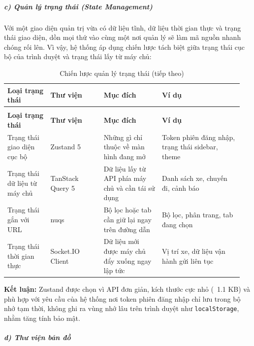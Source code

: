 \documentclass[a4paper]{extarticle}
\newcommand{\thesissettableid}[2]{%
  \renewcommand{\thetable}{#1}%
  \renewcommand{\theHtable}{#2}%
}
\begin{document}
\subparagraph{c) Quản lý trạng thái (State
Management)}\label{c-quux1ea3n-luxfd-trux1ea1ng-thuxe1i-state-management}

Với một giao diện quản trị vừa có dữ liệu tĩnh, dữ liệu thời gian thực và trạng
thái giao diện, dồn mọi thứ vào cùng một nơi quản lý sẽ làm mã nguồn
nhanh chóng rối lên. Vì vậy, hệ thống áp dụng chiến lược tách biệt giữa
trạng thái cục bộ của trình duyệt và trạng thái lấy từ máy chủ:


{\thesissettableid{3.25}{tab-ch3-chien-luoc-quan-ly-trang-thai}
\def\LTcaptype{table}
\begin{longtable}{|L{0.177\linewidth}|L{0.215\linewidth}|L{0.235\linewidth}|L{0.327\linewidth}|}
\caption{Chiến lược quản lý trạng thái}\label{tab:ch3-chien-luoc-quan-ly-trang-thai}\\
\hline \textbf{Loại trạng thái} & \textbf{Thư viện} & \textbf{Mục đích} & \textbf{Ví dụ} \\
\hline
\endfirsthead
\caption[]{Chiến lược quản lý trạng thái (tiếp theo)}\\
\hline \textbf{Loại trạng thái} & \textbf{Thư viện} & \textbf{Mục đích} & \textbf{Ví dụ} \\
\hline
\endhead
\hline
\endfoot
\endlastfoot
Trạng thái giao diện cục bộ & Zustand 5 & Những gì chỉ thuộc về màn hình
đang mở & Token phiên đăng nhập, trạng thái sidebar, theme \\\hline
Trạng thái dữ liệu từ máy chủ & TanStack Query 5 & Dữ liệu lấy từ API
phía máy chủ và cần tái sử dụng & Danh sách xe, chuyến đi, cảnh báo \\\hline
Trạng thái gắn với URL & nuqs & Bộ lọc hoặc tab cần giữ lại ngay trên
đường dẫn & Bộ lọc, phân trang, tab đang chọn \\\hline
Trạng thái thời gian thực & Socket.IO Client & Dữ liệu mới được máy chủ
đẩy xuống ngay lập tức & Vị trí xe, dữ liệu vận hành gửi liên tục \\\hline
\end{longtable}
}


\textbf{Kết luận:} Zustand được chọn vì API đơn giản, kích thước cực nhỏ
(~1.1 KB) và phù hợp với yêu cầu của hệ thống nơi token
phiên đăng nhập chỉ lưu trong bộ nhớ tạm thời, không ghi ra
vùng nhớ lâu trên trình duyệt như \texttt{localStorage}, nhằm tăng tính bảo mật.

\subparagraph{d) Thư viện bản
đồ}\label{d-thux1b0-viux1ec7n-bux1ea3n-ux111ux1ed3}
\end{document}
